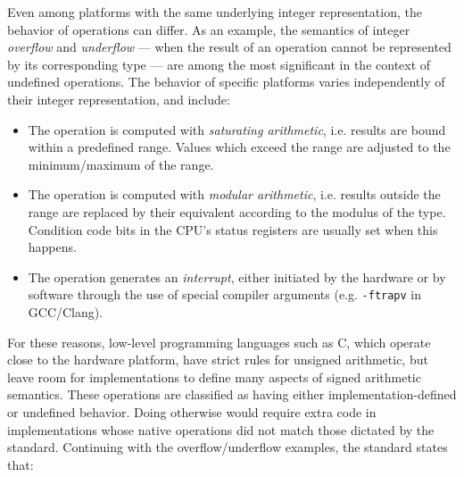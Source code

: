 
Even among platforms with the same underlying integer representation, the
behavior of operations can differ.  As an example, the semantics of integer
\textit{overflow} and \textit{underflow} --- when the result of an operation
cannot be represented by its corresponding type --- are among the most
significant in the context of undefined operations.  The behavior of specific
platforms varies independently of their integer representation, and include:

\begin{itemize}
    \item
        The operation is computed with \textit{saturating arithmetic}, i.e.
        results are bound within a predefined range.  Values which exceed the
        range are adjusted to the minimum/maximum of the range.
    \item
        The operation is computed with \textit{modular arithmetic}, i.e.
        results outside the range are replaced by their equivalent according to
        the modulus of the type.  Condition code bits in the CPU's status
        registers are usually set when this happens.
    \item
        The operation generates an \textit{interrupt}, either initiated by the
        hardware or by software through the use of special compiler arguments
        (e.g. \texttt{-ftrapv} in GCC/Clang).
\end{itemize}

For these reasons, low-level programming languages such as C, which operate
close to the hardware platform, have strict rules for unsigned arithmetic, but
leave room for implementations to define many aspects of signed arithmetic
semantics.  These operations are classified as having either
implementation-defined or undefined behavior.  Doing otherwise would require
extra code in implementations whose native operations did not match those
dictated by the standard\footnotemark.  Continuing with the overflow/underflow
examples, the standard states that:


